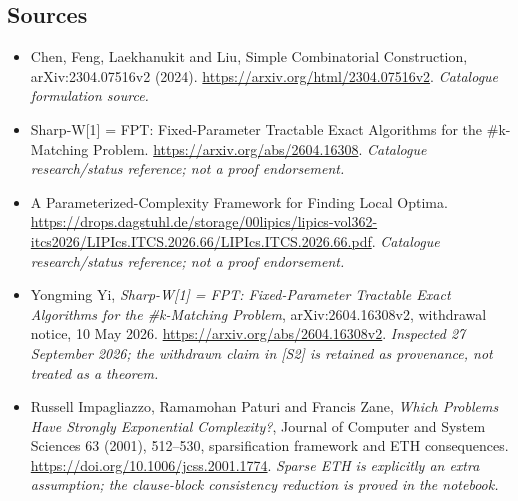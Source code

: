 \documentclass[11pt,a4paper]{article}
\numberwithin{equation}{section}
\begin{document}
\subsection{Sources}
\begin{itemize}\raggedright
\item[\textnormal{[S1]}]\hypertarget{source:76:1}{} Chen, Feng, Laekhanukit and Liu, Simple Combinatorial Construction, arXiv:2304.07516v2 (2024).
\url{https://arxiv.org/html/2304.07516v2}.
{\small\textit{Catalogue formulation source.}}
\item[\textnormal{[S2]}]\hypertarget{source:76:2}{} Sharp-W[1] = FPT: Fixed-Parameter Tractable Exact Algorithms for the \#k-Matching Problem.
\url{https://arxiv.org/abs/2604.16308}.
{\small\textit{Catalogue research/status reference; not a proof endorsement.}}
\item[\textnormal{[S3]}]\hypertarget{source:76:3}{} A Parameterized-Complexity Framework for Finding Local Optima.
\url{https://drops.dagstuhl.de/storage/00lipics/lipics-vol362-itcs2026/LIPIcs.ITCS.2026.66/LIPIcs.ITCS.2026.66.pdf}.
{\small\textit{Catalogue research/status reference; not a proof endorsement.}}
\item[\textnormal{[E1]}]\hypertarget{extra:76:1}{} Yongming Yi,
\emph{Sharp-W[1] = FPT: Fixed-Parameter Tractable Exact Algorithms for the
\#k-Matching Problem}, arXiv:2604.16308v2, withdrawal notice, 10 May 2026.
\url{https://arxiv.org/abs/2604.16308v2}.
{\small\textit{Inspected 27 September 2026; the withdrawn claim in [S2]
is retained as provenance, not treated as a theorem.}}
\item[\textnormal{[E2]}]\hypertarget{extra:76:2}{} Russell Impagliazzo,
Ramamohan Paturi and Francis Zane, \emph{Which Problems Have Strongly
Exponential Complexity?}, Journal of Computer and System Sciences 63
(2001), 512--530, sparsification framework and ETH consequences.
\url{https://doi.org/10.1006/jcss.2001.1774}.
{\small\textit{Sparse ETH is explicitly an extra assumption; the
clause-block consistency reduction is proved in the notebook.}}
\end{itemize}
\end{document}
